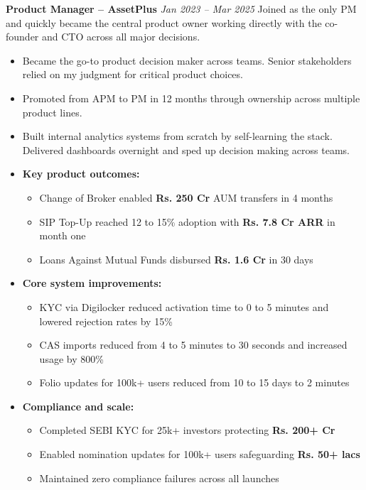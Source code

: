\documentclass[10pt,a4paper]{article}
\begin{document}
\noindent\textbf{Product Manager – AssetPlus} \hfill \textit{Jan 2023 – Mar 2025}
\vspace{-3pt}
{\small Joined as the only PM and quickly became the central product owner working directly with the co-founder and CTO across all major decisions.}
\vspace{2pt}

\begin{itemize}
  \item Became the go-to product decision maker across teams. Senior stakeholders relied on my judgment for critical product choices.
  
  \item Promoted from APM to PM in 12 months through ownership across multiple product lines.
  
  \item Built internal analytics systems from scratch by self-learning the stack. Delivered dashboards overnight and sped up decision making across teams.
  
  \item \textbf{Key product outcomes:}
  \begin{itemize}
      \item Change of Broker enabled \textbf{Rs. 250 Cr} AUM transfers in 4 months
      \item SIP Top-Up reached 12 to 15\% adoption with \textbf{Rs. 7.8 Cr ARR} in month one
      \item Loans Against Mutual Funds disbursed \textbf{Rs. 1.6 Cr} in 30 days
  \end{itemize}
  
  \item \textbf{Core system improvements:}
  \begin{itemize}
      \item KYC via Digilocker reduced activation time to 0 to 5 minutes and lowered rejection rates by 15\%
      \item CAS imports reduced from 4 to 5 minutes to 30 seconds and increased usage by 800\%
      \item Folio updates for 100k+ users reduced from 10 to 15 days to 2 minutes
  \end{itemize}
  
  \item \textbf{Compliance and scale:}
  \begin{itemize}
      \item Completed SEBI KYC for 25k+ investors protecting \textbf{Rs. 200+ Cr}
      \item Enabled nomination updates for 100k+ users safeguarding \textbf{Rs. 50+ lacs}
      \item Maintained zero compliance failures across all launches
  \end{itemize}
\end{itemize}
\end{document}
